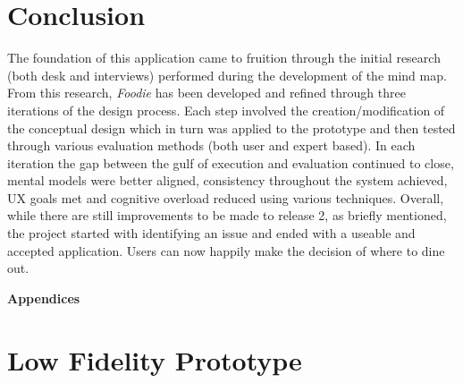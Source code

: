 \documentclass[a4 paper, 12pt]{article}
\begin{document}
\section{Conclusion}
The foundation of this application came to fruition through the initial research (both desk and interviews) performed during the development of the mind map. From this research, \textit{Foodie} has been developed and refined through three iterations of the design process. Each step involved the creation/modification of the conceptual design which in turn was applied to the prototype and then tested through various evaluation methods (both user and expert based). In each iteration the gap between the gulf of execution and evaluation continued to close, mental models were better aligned, consistency throughout the system achieved, UX goals met and cognitive overload reduced using various techniques. Overall, while there are still improvements to be made to release 2, as briefly mentioned, the project started with identifying an issue and ended with a useable and accepted application. Users can now happily make the decision of where to dine out.

\pagebreak





\appendix
\addappheadtotoc

\pagebreak
\begin{center}
    \Huge \textbf{Appendices}
    \section{Low Fidelity Prototype}
\end{center}

    \pagebreak
            
\end{document}
